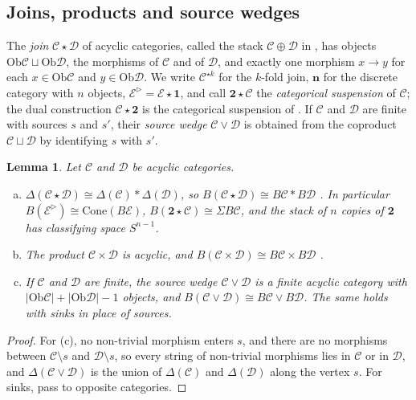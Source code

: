 \documentclass[12pt]{amsart}
\newtheorem{lemma}[teo]{Lemma}
\theoremstyle{definition}
\theoremstyle{remark}
\newcommand{\CC}{\mathcal{C}}
\newcommand{\DD}{\mathcal{D}}
\newcommand{\EE}{\mathcal{E}}
\newcommand{\Ob}{\mathrm{Ob}}
\newcommand{\cone}{\mathrm{Cone}}
\newcommand{\nerve}{\Delta}
\begin{document}
\subsection{Joins, products and source wedges}\label{subsec:constructions}\label{subsec:wedge}

The \emph{join} $\CC\star\DD$ of acyclic categories, called the stack $\CC\oplus\DD$ in \cite[Definition~10.7]{Kozlov2008}, has objects $\Ob\CC\sqcup\Ob\DD$, the morphisms of $\CC$ and of $\DD$, and exactly one morphism $x\to y$ for each $x\in\Ob\CC$ and $y\in\Ob\DD$. We write $\CC^{\star k}$ for the $k$-fold join, $\mathbf n$ for the discrete category with $n$ objects, $\EE^{\triangleright}=\EE\star\mathbf1$, and call $\mathbf 2\star\CC$ the \emph{categorical suspension} of $\CC$; the dual construction $\CC\star\mathbf2$ is the categorical suspension of \cite{CarcaciaCampos2026OpenCovers}. If $\CC$ and $\DD$ are finite with sources $s$ and $s'$, their \emph{source wedge} $\CC\vee\DD$ is obtained from the coproduct $\CC\sqcup\DD$ \cite[Section~10.3.1]{Kozlov2008} by identifying $s$ with $s'$.

\begin{lemma}\label{lem:join}
Let $\CC$ and $\DD$ be acyclic categories.
\begin{enumerate}[(a)]
\item $\nerve(\CC\star\DD)\cong\nerve(\CC)*\nerve(\DD)$, so $B(\CC\star\DD)\cong B\CC*B\DD$ \cite[(10.1), Section~2.3.2]{Kozlov2008}. In particular $B(\EE^{\triangleright})\cong\cone(B\EE)$, $B(\mathbf2\star\CC)\cong\Sigma B\CC$, and the stack of $n$ copies of $\mathbf2$ has classifying space $S^{n-1}$.
\item The product $\CC\times\DD$ is acyclic, and $B(\CC\times\DD)\cong B\CC\times B\DD$ \cite[Section~10.5.1, Theorem~10.21]{Kozlov2008}.
\item If $\CC$ and $\DD$ are finite, the source wedge $\CC\vee\DD$ is a finite acyclic category with $|\Ob\CC|+|\Ob\DD|-1$ objects, and $B(\CC\vee\DD)\cong B\CC\vee B\DD$. The same holds with sinks in place of sources.
\end{enumerate}
\end{lemma}

\begin{proof}
For (c), no non-trivial morphism enters $s$, and there are no morphisms between $\CC\setminus s$ and $\DD\setminus s$, so every string of non-trivial morphisms lies in $\CC$ or in $\DD$, and $\nerve(\CC\vee\DD)$ is the union of $\nerve(\CC)$ and $\nerve(\DD)$ along the vertex $s$. For sinks, pass to opposite categories.
\end{proof}
\end{document}
